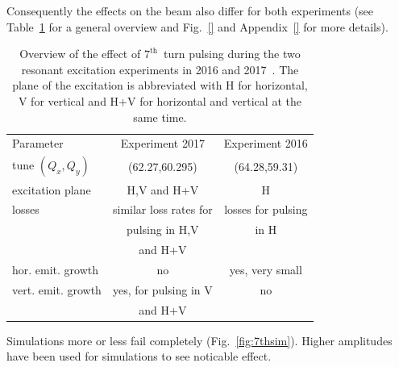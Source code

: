 \documentclass[%
 reprint,
 amsmath,amssymb,
 aps,
prstab,
]{revtex4-1}
\begin{document}
Consequently the effects on the beam also differ for both experiments (see Table~\ref{tab:7thexp} for a general overview and Fig.~\ref{} and Appendix~\ref{} for more details).
\begin{table}[h]
	\caption{\label{tab:7thexp}%
		Overview of the effect of $7^{\mathrm{th}}$~turn pulsing during the two resonant excitation experiments in 2016 and 2017~\cite{resexmd2016,resexmd2017}. The plane of the excitation is abbreviated with H for horizontal, V for vertical and H+V for horizontal and vertical at the same time.
	}
	\begin{ruledtabular}
		\begin{tabular}{lcc}
			Parameter & Experiment 2017 & Experiment 2016  \\
			\colrule
			tune $(Q_x,Q_y)$ & (62.27,60.295) & (64.28,59.31)\\\hline
			excitation plane  & H,V and H+V&  H\\
			losses & similar loss rates for  & losses for pulsing \\
			& pulsing in H,V & in H \\
			&  and H+V & \\
			hor. emit. growth & no & yes, very small \\
			vert. emit. growth & yes, for pulsing in V & no\\
			&  and H+V & \\
		\end{tabular}
	\end{ruledtabular}
\end{table}
Simulations more or less fail completely (Fig.~\ref{fig:7thsim}). Higher amplitudes have been used for simulations to see noticable effect.
\end{document}
